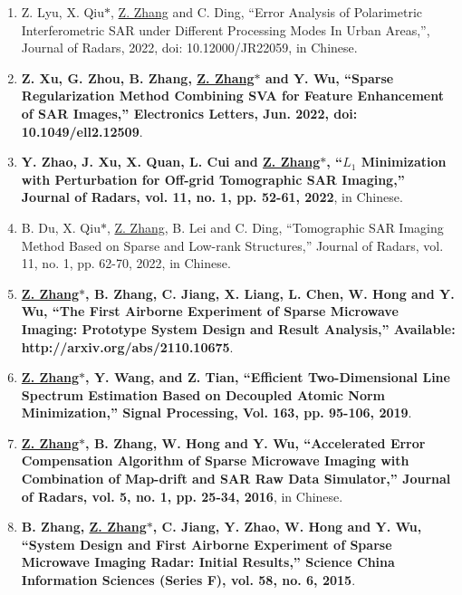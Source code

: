 \documentclass[paper=a4,fontsize=11pt]{scrartcl}
\begin{document}
\begin{enumerate}
\item Z. Lyu, X. Qiu$\ast$, \underline{Z. Zhang} and C. Ding, ``Error Analysis of Polarimetric Interferometric SAR under Different Processing Modes In Urban Areas,'', Journal of Radars, 2022, doi: 10.12000/JR22059, in Chinese.

\item \textbf{Z. Xu, G. Zhou, B. Zhang, \underline{Z. Zhang$\ast$} and Y. Wu, ``Sparse Regularization Method Combining SVA for Feature Enhancement of SAR Images,'' Electronics Letters, Jun. 2022, doi: 10.1049/ell2.12509}.

\item \textbf{Y. Zhao, J. Xu, X. Quan, L. Cui and \underline{Z. Zhang$\ast$}, ``$L_1$ Minimization with Perturbation for Off-grid Tomographic SAR Imaging,'' Journal of Radars, vol. 11, no. 1, pp. 52-61, 2022}, in Chinese.

\item B. Du, X. Qiu$\ast$, \underline{Z. Zhang}, B. Lei and C. Ding, ``Tomographic SAR Imaging Method Based on Sparse and Low-rank Structures,'' Journal of Radars, vol. 11, no. 1, pp. 62-70, 2022, in Chinese.


\item \textbf{\underline{Z. Zhang$\ast$}, B. Zhang, C. Jiang, X. Liang, L. Chen, W. Hong and Y. Wu, ``The First Airborne Experiment of Sparse Microwave Imaging: Prototype System Design and Result Analysis,'' Available: http://arxiv.org/abs/2110.10675}.

\item \textbf{\underline{Z. Zhang$\ast$}, Y. Wang, and Z. Tian, ``Efficient Two-Dimensional Line Spectrum Estimation Based on Decoupled Atomic Norm Minimization,'' Signal Processing, Vol. 163, pp. 95-106, 2019}.



\item \textbf{\underline{Z. Zhang$\ast$}, B. Zhang, W. Hong and Y. Wu, ``Accelerated Error Compensation Algorithm of Sparse Microwave Imaging with Combination of Map-drift and SAR Raw Data Simulator,'' Journal of Radars, vol. 5, no. 1, pp. 25-34, 2016}, in Chinese.

\item \textbf{B. Zhang, \underline{Z. Zhang$\ast$}, C. Jiang, Y. Zhao, W. Hong and Y. Wu, ``System Design and First Airborne Experiment of Sparse Microwave Imaging Radar: Initial Results,'' Science China Information Sciences (Series F), vol. 58, no. 6, 2015}.


\end{enumerate}
\end{document}

